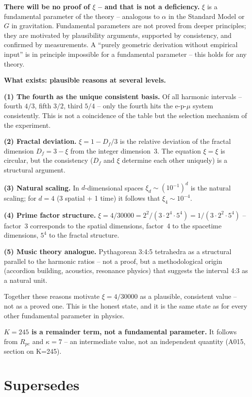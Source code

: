 \textbf{There will be no proof of $\xi$ -- and that is not a deficiency.}
$\xi$ is a fundamental parameter of the theory -- analogous to $\alpha$ in
the Standard Model or $G$ in gravitation. Fundamental parameters are not
proved from deeper principles; they are motivated by plausibility arguments,
supported by consistency, and confirmed by measurements. A ``purely geometric
derivation without empirical input'' is in principle impossible for a
fundamental parameter -- this holds for any theory.

\textbf{What exists: plausible reasons at several levels.}

\textbf{(1) The fourth as the unique consistent basis.} Of all harmonic
intervals -- fourth $4/3$, fifth $3/2$, third $5/4$ -- only the fourth
hits the e-p-$\mu$ system consistently. This is not a coincidence of the
table but the selection mechanism of the experiment.

\textbf{(2) Fractal deviation.} $\xi=1-D_f/3$ is the relative deviation
of the fractal dimension $D_f=3-\xi$ from the integer dimension~3.
The equation $\xi=\xi$ is circular, but the consistency ($D_f$ and $\xi$
determine each other uniquely) is a structural argument.

\textbf{(3) Natural scaling.} In $d$-dimensional spaces $\xi_d\sim(10^{-1})^d$
is the natural scaling; for $d=4$ (3 spatial + 1 time) it follows that
$\xi_4\sim10^{-4}$.

\textbf{(4) Prime factor structure.} $\xi=4/30000=2^2/(3\cdot2^4\cdot5^4)
=1/(3\cdot2^2\cdot5^4)$ -- factor~3 corresponds to the spatial dimensions,
factor~4 to the spacetime dimensions, $5^4$ to the fractal structure.

\textbf{(5) Music theory analogue.} Pythagorean 3:4:5 tetrahedra as a
structural parallel to the harmonic ratios -- not a proof, but a methodological
origin (accordion building, acoustics, resonance physics) that suggests the
interval 4:3 as a natural unit.

Together these reasons motivate $\xi=4/30000$ as a plausible, consistent
value -- not as a proved one. This is the honest state, and it is the same
state as for every other fundamental parameter in physics.

\textbf{$K=245$ is a remainder term, not a fundamental parameter.} It follows
from $R_{pe}$ and $\kappa=7$ -- an intermediate value, not an independent
quantity (A015, section on K=245).

\section{Supersedes}


